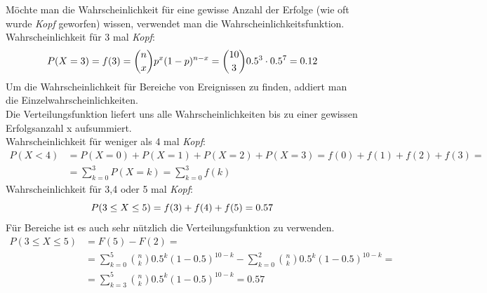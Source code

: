 \begin{bsp}

    Möchte man die Wahrscheinlichkeit für eine gewisse Anzahl der Erfolge (wie oft wurde \emph{Kopf} geworfen) wissen, verwendet man die Wahrscheinlichkeitsfunktion. \\
    Wahrscheinlichkeit für 3 mal \emph{Kopf}:
    \[
        P(X=3) = f(3) = \binom{n}{x} p^x (1-p)^{n-x} = \binom{10}{3} 0.5^3 \cdot 0.5^7 = 0.12 \\
    \]
    Um die Wahrscheinlichkeit für Bereiche von Ereignissen zu finden, addiert man die Einzelwahrscheinlichkeiten. \\
    Die Verteilungsfunktion liefert uns alle Wahrscheinlichkeiten bis zu einer gewissen Erfolgsanzahl x aufsummiert. \\
    Wahrscheinlichkeit für weniger als 4 mal \emph{Kopf}:
    \begin{align*}
        P(X<4) &= P(X=0)+P(X=1)+P(X=2)+P(X=3) = f(0)+f(1)+f(2)+f(3) = \\
               &= \sum_{k=0}^3 P(X=k) = \sum_{k=0}^3 f(k)
    \end{align*}
    Wahrscheinlichkeit für 3,4 oder 5 mal \emph{Kopf}:
    \[
        P(3 \leq X \leq 5) = f(3) + f(4) + f(5) = 0.57 \\
    \]
    Für Bereiche ist es auch sehr nützlich die Verteilungsfunktion zu verwenden.
    \begin{align*}
        P(3 \leq X \leq 5) &= F(5) - F(2) = \\
        &= \sum_{k=0}^{5} \binom{n}{k} 0.5^k (1-0.5)^{10-k} - \sum_{k=0}^{2} \binom{n}{k} 0.5^k (1-0.5)^{10-k} =\\
        &= \sum_{k=3}^{5} \binom{n}{k} 0.5^k (1-0.5)^{10-k} = 0.57
    \end{align*}
    

\end{bsp}
